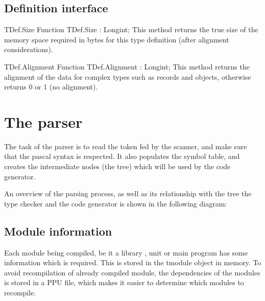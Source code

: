 \documentclass [a4paper,12pt]{article}
\begin{document}
\subsection{Definition interface}
\label{subsec:definition}

\begin{function}{TDef.Size}
\Declaration
Function TDef.Size : Longint;
\Description
This method returns the true size of the memory space required in bytes for
this type definition (after alignment considerations).
\end{function}

\begin{function}{TDef.Alignment}
\Declaration
Function TDef.Alignment : Longint;
\Description
This method returns the alignment of the data for complex types such as
records and objects, otherwise returns 0 or 1 (no alignment).
\end{function}

\section{The parser}
\label{sec:mylabel5}

The task of the parser is to read the token fed by the scanner, and make
sure that the pascal syntax is respected. It also populates the symbol
table, and creates the intermediate nodes (the tree) which will be used by
the code generator.

An overview of the parsing process, as well as its relationship with the
tree the type checker and the code generator is shown in the following
diagram:

\subsection{Module information}
\label{subsec:module}

Each module being compiled, be it a library , unit or main program has some
information which is required. This is stored in the tmodule object in
memory. To avoid recompilation of already compiled module, the dependencies
of the modules is stored in a PPU file, which makes it easier to determine
which modules to recompile.
\end{document}

